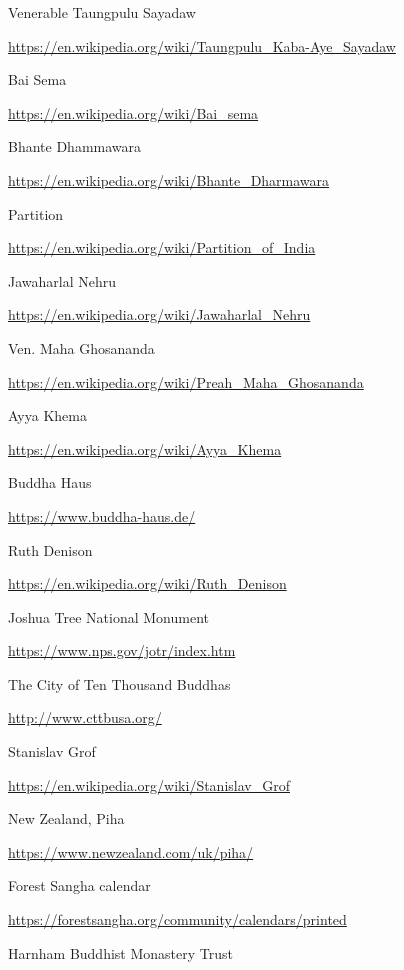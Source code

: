 \begin{thebibliography}{9}
 Venerable Taungpulu Sayadaw

  {\urlsize \url{https://en.wikipedia.org/wiki/Taungpulu_Kaba-Aye_Sayadaw}}

 Bai Sema

  {\urlsize \url{https://en.wikipedia.org/wiki/Bai_sema}}

 Bhante Dhammawara

  {\urlsize \url{https://en.wikipedia.org/wiki/Bhante_Dharmawara}}

 Partition

  {\urlsize \url{https://en.wikipedia.org/wiki/Partition_of_India}}

 Jawaharlal Nehru

  {\urlsize \url{https://en.wikipedia.org/wiki/Jawaharlal_Nehru}}

 Ven. Maha Ghosananda

  {\urlsize \url{https://en.wikipedia.org/wiki/Preah_Maha_Ghosananda}}

 Ayya Khema

  {\urlsize \url{https://en.wikipedia.org/wiki/Ayya_Khema}}

 Buddha Haus

  {\urlsize \url{https://www.buddha-haus.de/}}

 Ruth Denison

  {\urlsize \url{https://en.wikipedia.org/wiki/Ruth_Denison}}

 Joshua Tree National Monument

  {\urlsize \url{https://www.nps.gov/jotr/index.htm}}

 The City of Ten Thousand Buddhas

  {\urlsize \url{http://www.cttbusa.org/}}

 Stanislav Grof

  {\urlsize \url{https://en.wikipedia.org/wiki/Stanislav_Grof}}

 New Zealand, Piha

  {\urlsize \url{https://www.newzealand.com/uk/piha/}}

 Forest Sangha calendar

  {\urlsize \url{https://forestsangha.org/community/calendars/printed}}

 Harnham Buddhist Monastery Trust


\end{thebibliography}
